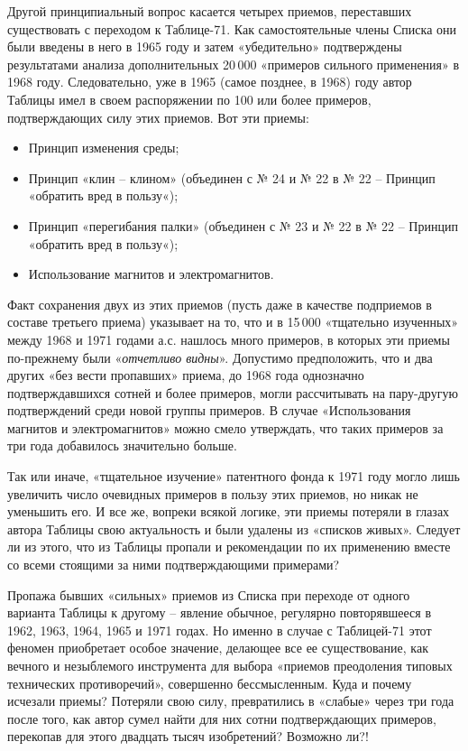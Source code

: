 \documentclass[11pt,a4paper]{article}
\begin{document}
Другой принципиальный вопрос касается четырех приемов, переставших
существовать с переходом к Таблице-71. Как самостоятельные члены Списка они
были введены в него в 1965 году и затем «убедительно» подтверждены
результатами анализа дополнительных 20\,000 «примеров сильного применения» в
1968 году. Следовательно, уже в 1965 (самое позднее, в 1968) году автор
Таблицы имел в своем распоряжении по 100 или более примеров, подтверждающих
силу этих приемов. Вот эти приемы:
\begin{itemize}
\item Принцип изменения среды;
\item Принцип «клин -- клином» (объединен с № 24 и № 22 в № 22 -- Принцип
  «обратить вред в пользу«);
\item Принцип «перегибания палки» (объединен с № 23 и № 22 в № 22 -- Принцип
  «обратить вред в пользу«);
\item Использование магнитов и электромагнитов.
\end{itemize}
Факт сохранения двух из этих приемов (пусть даже в качестве подприемов в
составе третьего приема) указывает на то, что и в 15\,000 «тщательно
изученных» между 1968 и 1971 годами а.с. нашлось много примеров, в которых эти
приемы по-прежнему были «\emph{отчетливо видны}». Допустимо предположить, что
и два других «без вести пропавших» приема, до 1968 года однозначно
подтверждавшихся сотней и более примеров, могли рассчитывать на пару-другую
подтверждений среди новой группы примеров. В случае «Использования магнитов и
электромагнитов» можно смело утверждать, что таких примеров за три года
добавилось значительно больше.

Так или иначе, «тщательное изучение» патентного фонда к 1971 году могло лишь
увеличить число очевидных примеров в пользу этих приемов, но никак не
уменьшить его. И все же, вопреки всякой логике, эти приемы потеряли в глазах
автора Таблицы свою актуальность и были удалены из «списков живых». Следует ли
из этого, что из Таблицы пропали и рекомендации по их применению вместе со
всеми стоящими за ними подтверждающими примерами?

Пропажа бывших «сильных» приемов из Списка при переходе от одного варианта
Таблицы к другому -- явление обычное, регулярно повторявшееся в 1962, 1963,
1964, 1965 и 1971 годах. Но именно в случае с Таблицей-71 этот феномен
приобретает особое значение, делающее все ее существование, как вечного и
незыблемого инструмента для выбора «приемов преодоления типовых технических
противоречий», совершенно бессмысленным. Куда и почему исчезали приемы?
Потеряли свою силу, превратились в «слабые» через три года после того, как
автор сумел найти для них сотни подтверждающих примеров, перекопав для этого
двадцать тысяч изобретений? Возможно ли?!
\end{document}
